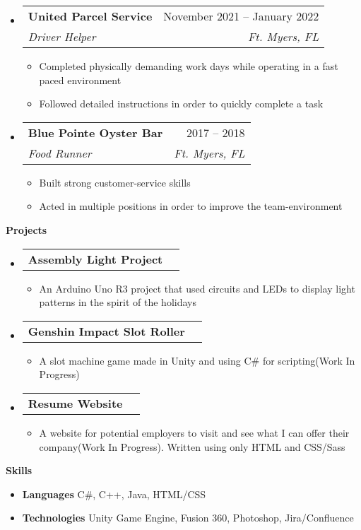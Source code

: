 \documentclass[letterpaper,12pt]{article}[leftmargin=*]
\makeatletter
\def \entryspacing {-0pt}
\renewcommand{\section}[2]{\vspace{5pt}
  \colorbox{secondary}{\color{white}\raggedbottom\normalsize\textbf{{#1}{\hspace{7pt}#2}}}
}
\newcommand{\resumeEntryStart}{\begin{itemize}[leftmargin=2.5mm]}
\newcommand{\resumeEntryEnd}{\end{itemize}\vspace{\entryspacing}}
\newcommand{\resumeItemListStart}{\begin{itemize}[leftmargin=4.5mm]}
\newcommand{\resumeItemListEnd}{\end{itemize}}
\newcommand{\resumeItem}[1]{
  \item\small{
    {#1 \vspace{-2pt}}
  }
}
\newcommand{\resumeEntryTSDL}[4]{
  \vspace{-1pt}\item[]
    \begin{tabularx}{0.97\textwidth}{X@{\hspace{60pt}}r}
      \textbf{\color{primary}#1} & {\firabook\color{accent}\small#2} \\
      \textit{\color{accent}\small#3} & \textit{\color{accent}\small#4} \\
    \end{tabularx}\vspace{-6pt}
}
\newcommand{\resumeEntryTD}[2]{
  \vspace{-1pt}\item[]
    \begin{tabularx}{0.97\textwidth}{X@{\hspace{60pt}}r}
      \textbf{\color{primary}#1} & {\firabook\color{accent}\small#2} \\
    \end{tabularx}\vspace{-6pt}
}
\newcommand{\resumeEntryS}[2]{
  \item[]\small{
    \textbf{\color{primary}#1 }{ #2 \vspace{-6pt}}
  }
}
\makeatother
\begin{document}
  \resumeEntryStart
    \resumeEntryTSDL
      {United Parcel Service}{November 2021 -- January 2022}
      {Driver Helper}{Ft. Myers, FL}
    \resumeItemListStart
      \resumeItem {Completed physically demanding work days while operating in a fast paced environment}
      \resumeItem {Followed detailed instructions in order to quickly complete a task}
    \resumeItemListEnd
  \resumeEntryEnd

  \resumeEntryStart
    \resumeEntryTSDL
      {Blue Pointe Oyster Bar}{2017 -- 2018}
      {Food Runner}{Ft. Myers, FL}
    \resumeItemListStart
        \resumeItem {Built strong customer-service skills}
        \resumeItem {Acted in multiple positions in order to improve the team-environment}
    \resumeItemListEnd
  \resumeEntryEnd


\section{\faFlask}{Projects}

  \resumeEntryStart
    \resumeEntryTD
      {Assembly Light Project}{}
    \resumeItemListStart
      \resumeItem {An Arduino Uno R3 project that used circuits and LEDs to display light patterns in the spirit of the holidays}
    \resumeItemListEnd
  \resumeEntryEnd

  \resumeEntryStart
    \resumeEntryTD
      {Genshin Impact Slot Roller}{}
    \resumeItemListStart
      \resumeItem {A slot machine game made in Unity and using C\# for scripting(Work In Progress)}
    \resumeItemListEnd
  \resumeEntryEnd

  \resumeEntryStart
    \resumeEntryTD
      {Resume Website}{}
    \resumeItemListStart
      \resumeItem {A website for potential employers to visit and see what I can offer their company(Work In Progress). Written using only HTML and CSS/Sass}
    \resumeItemListEnd
  \resumeEntryEnd

\section{\faGears}{Skills}
 \resumeEntryStart
  \resumeEntryS{Languages } {C\#, C++, Java, HTML/CSS}
  \resumeEntryS{Technologies } {Unity Game Engine, Fusion 360, Photoshop, Jira/Confluence}
 \resumeEntryEnd
\end{document}
